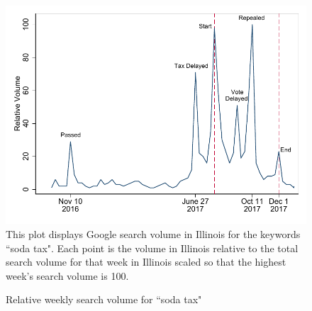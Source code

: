 \documentclass[12pt]{article}
\begin{document}
\clearpage
\begin{figure}[t]\centering
  \caption{Relative weekly search volume for ``soda tax"}
  \label{gtrends}
	\includegraphics[width = \textwidth]{../figures/gtrends.pdf}
	\footnotesize This plot displays Google search volume in Illinois for the keywords ``soda tax". Each point is the volume in Illinois relative to the total search volume for that week in Illinois scaled so that the highest week's search volume is 100.
\end{figure}
\end{document}
